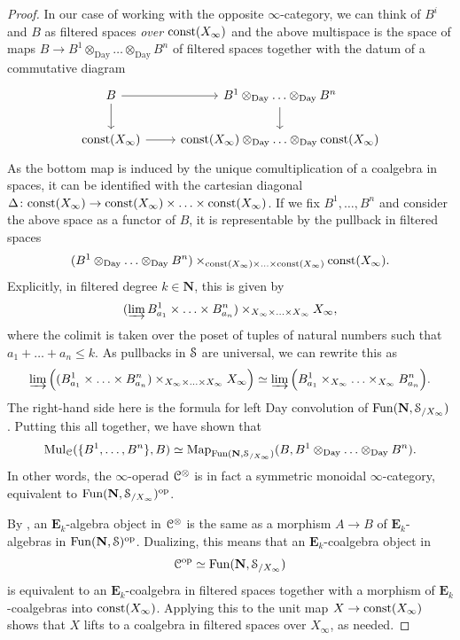 \documentclass[oneside,a4paper]{amsart}
\begin{document}
\begin{proof}
In our case of working with the opposite $\infty$-category, we can think of $B^{i}$ and $B$ as filtered spaces \emph{over} $\mathrm{const}(X_{\infty})$ and the above multispace is the space of maps $B \rightarrow B^{1} \otimes_{\mathrm{Day}} \ldots \otimes_{\mathrm{Day}} B^{n}$ of filtered spaces together with the datum of a commutative diagram 
\[
\begin{tikzcd}
	B & {B^{1} \otimes_{\mathrm{Day}} \ldots \otimes_{\mathrm{Day}} B^{n}} \\
	{\const(X_{\infty})} & {\const(X_{\infty}) \otimes_{\mathrm{Day}} \ldots \otimes_{\mathrm{Day}}\const(X_{\infty})}
	\arrow[from=1-1, to=1-2]
	\arrow[from=1-1, to=2-1]
	\arrow[from=1-2, to=2-2]
	\arrow[from=2-1, to=2-2]
\end{tikzcd}
\]
As the bottom map is induced by the unique comultiplication of a coalgebra in spaces, it can be identified with the cartesian diagonal $\Delta \colon  \mathrm{const}(X_{\infty}) \rightarrow \mathrm{const}(X_{\infty}) \times \ldots \times \mathrm{const}(X_{\infty})$. If we fix $B^{1}, \ldots, B^{n}$ and consider the above space as a functor of $B$, it is representable by the pullback in filtered spaces 
\[
(B^{1} \otimes_{\mathrm{Day}} \ldots \otimes_{\mathrm{Day}} B^{n}) \times_{\mathrm{const}(X_{\infty}) \times \ldots \times \mathrm{const}(X_{\infty})} \mathrm{const}(X_{\infty}). 
\]
Explicitly, in filtered degree $k \in \mathbf{N}$, this is given by 
\[
(\varinjlim B^{1}_{a_{1}} \times \ldots \times B^{n}_{a_{n}}) \times_{X_{\infty} \times \ldots \times X_{\infty}} X_{\infty},
\] 
where the colimit is taken over the poset of tuples of natural numbers such that $a_{1}+\ldots+a_{n} \leq k$. As pullbacks in $\EuScript{S}$ are universal, we can rewrite this as 
\[
\varinjlim \Big((B^{1}_{a_{1}} \times \ldots \times B^{n}_{a_{n}}) \times_{X_{\infty} \times \ldots \times X_{\infty}} X_{\infty}\Big) \simeq \varinjlim \Big( B^{1}_{a_{1}} \times_{X_{\infty}} \ldots \times_{X_{\infty}} B^{n}_{a_{n}} \Big). 
\] 
The right-hand side here is the formula for left Day convolution of $\mathrm{Fun}(\mathbf{N}, \EuScript{S}_{/X_{\infty}})$. Putting this all together, we have shown that 
\[
\mathrm{Mul}_{\EuScript{C}} (\{ B^{1}, \ldots, B^{n} \}, B ) \simeq \mathrm{Map}_{\mathrm{Fun}(\mathbf{N}, \EuScript{S}_{/X_{\infty}})}(B, B^{1} \otimes_{\mathrm{Day}} \ldots \otimes_{\mathrm{Day}} B^{n}).
\]
In other words, the $\infty$-operad $\EuScript{C}^{\otimes}$ is in fact a symmetric monoidal $\infty$-category, equivalent to $\mathrm{Fun}(\mathbf{N}, \EuScript{S}_{/X_{\infty}})^{\mathrm{op}}$.

By \cite[{Corollary 3.4.1.7}]{HA}, an $\mathbf{E}_{k}$-algebra object in $\EuScript{C}^{\otimes}$ is the same as a morphism $A \rightarrow B$ of $\mathbf{E}_{k}$-algebras in $\mathrm{Fun}(\mathbf{N}, \EuScript{S})^{\mathrm{op}}$. Dualizing, this means that an $\mathbf{E}_{k}$-coalgebra object in 
\[
\EuScript{C}^{\mathrm{op}} \simeq \mathrm{Fun}(\mathbf{N}, \EuScript{S}_{/X_{\infty}}) 
\]
is equivalent to an $\mathbf{E}_{k}$-coalgebra in filtered spaces together with a morphism of $\mathbf{E}_{k}$-coalgebras into $\mathrm{const}(X_{\infty})$. Applying this to the unit map $X \rightarrow \mathrm{const}(X_{\infty})$ shows that $X$ lifts to a coalgebra in filtered spaces over $X_{\infty}$, as needed. 
\end{proof}
\end{document}
